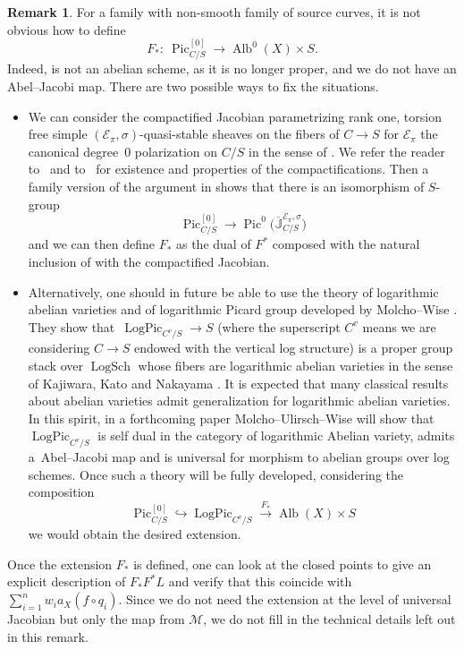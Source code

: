 \documentclass[11pt]{article}
\numberwithin{equation}{section}
\newcommand{\Pic}{\operatorname{Pic}}
\newcommand{\Alb}{\operatorname{Alb}}
\newcommand{\M}{\mathcal{M}}
\numberwithin{equation}{section}
\theoremstyle{definition}
\newtheorem{remarkk}[theo]{Remark}
\begin{document}
\begin{remarkk}
For a family  with non-smooth family of source curves, it is not obvious how to define
\[F_*\colon\ \Pic^{[0]}_{C\slash S}\to\operatorname{Alb}^0(X)\times S.\]
Indeed, \smash{$\Pic^{[0]}_{C\slash S}\to S$} is not an abelian scheme, as it is no longer proper, and we do not have an Abel--Jacobi map. There are two possible ways to fix the situations.
\begin{itemize}\itemsep=0pt
\item We can consider the compactified Jacobian \smash{$\Pic^{[0]}_{C\slash S}\subseteq \overline{\mathbb J}_{C/S}^{\mathcal E_{\pi},\sigma}$} parametrizing rank one, torsion free simple $(\mathcal E_{\pi},\sigma)$-quasi-stable sheaves on the fibers of $C\to S$ for $\mathcal E_{\pi}$ the canonical degree~$0$ polarization on $C\slash S$ in the sense of \cite[Section~2.1]{melo2015compactifications}. We refer the reader to~\cite{melo2015compactifications} and to~\cite{MeloRapagnettaViviani} for existence and properties of the compactifications.
Then a family version of the argument in \cite[Section~5]{MeloRapagnettaViviani} shows that there is an isomorphism of $S$-group
\[
\Pic^{[0]}_{C\slash S}\to \Pic^0\bigl(\overline{\mathbb J}_{C/S}^{\mathcal E_{\pi},\sigma}\bigr)
\]
and we can then define $F_*$ as the dual of $F^*$ composed with the natural inclusion of \smash{$\Pic^{[0]}_{C\slash S}$} with the compactified Jacobian.

\item Alternatively, one should in future be able to use the theory of logarithmic abelian varieties and of logarithmic Picard group developed by Molcho--Wise \cite{molchowiselog}. They show that~$\operatorname{LogPic}_{C^v\slash S}\to S$ (where the superscript $C^v$ means we are considering $C\to S$ endowed with the vertical log structure)
is a proper group stack over $\operatorname{LogSch}$
whose fibers are logarithmic abelian varieties in the sense of Kajiwara, Kato and Nakayama \cite{kajiwara2008logarithmic}.
It is expected that many classical results about abelian varieties admit generalization for logarithmic abelian varieties. In this spirit, in a forthcoming paper \cite{delignepair} Molcho--Ulirsch--Wise will show that $\operatorname{LogPic}_{C^v\slash S}$ is self dual in the category of logarithmic Abelian variety, admits a~Abel--Jacobi map and is universal for morphism to abelian groups over log schemes.
Once such a theory will be fully developed, considering the composition
 \[
 \Pic^{[0]}_{C\slash S}\hookrightarrow \operatorname{LogPic}_{C^v\slash S}\xrightarrow{F_*}\Alb(X)\times S
 \]
we would obtain the desired extension.
\end{itemize}

Once the extension $F_*$ is defined, one can look at the closed points to give an explicit description of $F_*F^*L$ and verify that this coincide with $\sum_{i=1}^n w_i a_X(f\circ q_i)$.
Since we do not need the extension at the level of universal Jacobian but only the map from $\M$, we do not fill in the technical details left out in this remark.
\end{remarkk}
\end{document}
